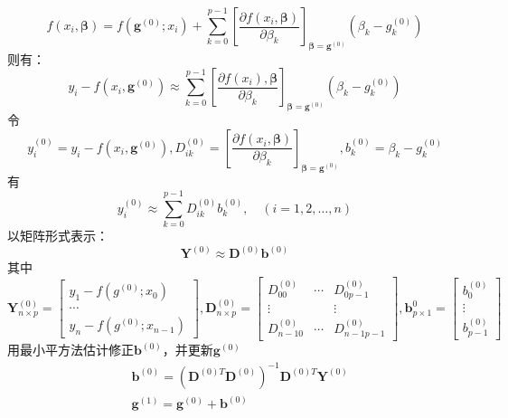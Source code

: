 \documentclass[master]{thesis-uestc}
\begin{document}
\begin{equation*}
    f(x_i,\mathbf{\beta})=f(\mathbf{g}^{(0)};x_i) + \sum_{k=0}^{p-1}\left[\frac{\partial f(x_i,\mathbf{\beta})}{\partial \beta_k}\right]_{\mathbf{\beta}=\mathbf{g}^{(0)}}\left(\beta_k-g_k^{(0)}\right)
\end{equation*}
则有：
\begin{equation*}
    y_i - f(x_i,\mathbf{g}^{(0)}) \approx \sum_{k=0}^{p-1}\left[\frac{\partial f(x_i),\mathbf{\beta}}{\partial \beta_k}\right]_{\mathbf{\beta}=\mathbf{g}^{(0)}}\left(\beta_k-g_k^{(0)}\right)
\end{equation*}
令
\begin{equation*}
    y_i^{(0)}=y_i- f(x_i,\mathbf{g}^{(0)}), D_{i k}^{(0)}=\left[\frac{\partial f(x_i,\mathbf{\beta})}{\partial \beta_k}\right]_{\mathbf{\beta}=\mathbf{g}^{(0)}}, b_k^{(0)}=\beta_k-g_k^{(0)}
\end{equation*}
有
\begin{equation*}
    y_i^{(0)} \approx \sum_{k=0}^{p-1} D_{i k}^{(0)} b_k^{(0)}, \quad(i=1,2, \ldots, n)
\end{equation*}
以矩阵形式表示：
\begin{equation*}
    \mathbf{Y}^{(0)} \approx \mathbf{D}^{(0)} \mathbf{b}^{(0)}
\end{equation*}
其中
\begin{equation*}
    \mathbf{Y}_{n \times p}^{(0)}=\left[\begin{array}{c}
        y_1-f\left(g^{(0)};x_0\right) \\
        \cdots \\
        y_n-f\left(g^{(0)};x_{n-1}\right)
        \end{array}\right], \mathbf{D}_{n \times p}^{(0)}=\left[\begin{array}{ccc}
        D_{00}^{(0)} & \cdots & D_{0 p-1}^{(0)} \\
        \vdots & & \vdots \\
        D_{n-1 0}^{(0)} & \cdots & D_{n-1 p-1}^{(0)}
        \end{array}\right], \mathbf{b}_{p \times 1}^0=\left[\begin{array}{c}
        b_0^{(0)} \\
        \vdots \\
        b_{p-1}^{(0)}
        \end{array}\right]
\end{equation*}
用最小平方法估计修正$\mathbf{b}^{(0)}$，并更新$\mathbf{g}^{(0)}$
\begin{equation*}
    \begin{aligned}
        &\mathbf{b}^{(0)}=\left(\mathbf{D}^{(0) T} \mathbf{D}^{(0)}\right)^{-1} \mathbf{D}^{(0) T} \mathbf{Y}^{(0)} \\
        &\mathbf{g}^{(1)} =\mathbf{g}^{(0)}+\mathbf{b}^{(0)}
    \end{aligned}
\end{equation*}
\end{document}
